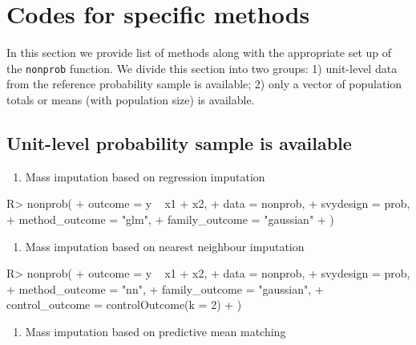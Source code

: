 \documentclass[
]{jss}
\providecommand{\tightlist}{%
  \setlength{\itemsep}{0pt}\setlength{\parskip}{0pt}}
\begin{document}
\section{Codes for specific methods}\label{sec-examples}

In this section we provide list of methods along with the appropriate
set up of the \texttt{nonprob} function. We divide this section into two
groups: 1) unit-level data from the reference probability sample is
available; 2) only a vector of population totals or means (with
population size) is available.

\subsection{Unit-level probability sample is
available}\label{unit-level-probability-sample-is-available}

\begin{enumerate}
\def\labelenumi{\arabic{enumi}.}
\tightlist
\item
  Mass imputation based on regression imputation
\end{enumerate}

\begin{CodeChunk}
\begin{CodeInput}
R> nonprob(
+   outcome = y ~ x1 + x2, 
+   data = nonprob, 
+   svydesign = prob, 
+   method_outcome = "glm", 
+   family_outcome = "gaussian"
+ )
\end{CodeInput}
\end{CodeChunk}

\begin{enumerate}
\def\labelenumi{\arabic{enumi}.}
\setcounter{enumi}{1}
\tightlist
\item
  Mass imputation based on nearest neighbour imputation
\end{enumerate}

\begin{CodeChunk}
\begin{CodeInput}
R> nonprob(
+   outcome = y ~ x1 + x2, 
+   data = nonprob, 
+   svydesign = prob, 
+   method_outcome = "nn", 
+   family_outcome = "gaussian", 
+   control_outcome = controlOutcome(k = 2)
+ )
\end{CodeInput}
\end{CodeChunk}

\begin{enumerate}
\def\labelenumi{\arabic{enumi}.}
\setcounter{enumi}{2}
\tightlist
\item
  Mass imputation based on predictive mean matching
\end{enumerate}
\end{document}
